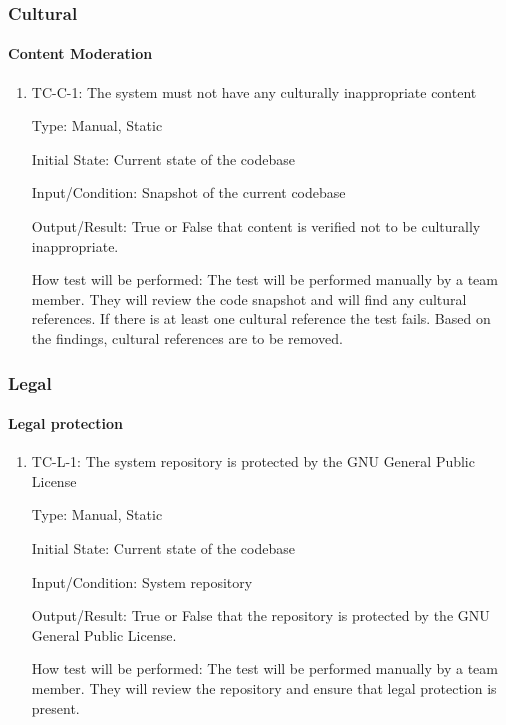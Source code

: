 \documentclass[12pt, titlepage]{article}
\begin{document}
\subsubsection{Cultural}

\paragraph{Content Moderation}
\begin{enumerate}
\item{TC-C-1: The system must not have any culturally inappropriate content}

Type: Manual, Static
					
Initial State: Current state of the codebase
					
Input/Condition: Snapshot of the current codebase 
					
Output/Result: True or False that content is verified not to be culturally inappropriate.
					
How test will be performed: The test will be performed manually by a team member. They will review the code snapshot and will find any cultural references. If there is at least one cultural reference the test fails. Based on the findings, cultural references are to be removed.
\end{enumerate}

\subsubsection{Legal}

\paragraph{Legal protection}
\begin{enumerate}
\item{TC-L-1: The system repository is protected by the GNU General Public License}

Type: Manual, Static
					
Initial State: Current state of the codebase
					
Input/Condition: System repository
					
Output/Result: True or False that the repository is protected by the GNU General Public License.
					
How test will be performed: The test will be performed manually by a team member. They will review the repository and ensure that legal protection is present.
\end{enumerate}
\end{document}
